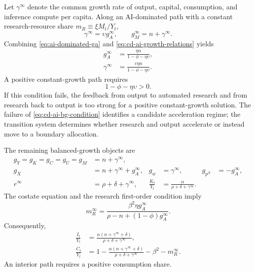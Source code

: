 Let $\gamma^\infty$ denote the common growth rate of output, capital,
consumption, and inference compute per capita. Along an AI-dominated path with a
constant research-resource share $m_R\equiv\xi M_t/Y_t$,
\begin{equation}
    \gamma^\infty=\upsilon g_A^\infty,
    \qquad
    g_M^\infty=n+\gamma^\infty.
    \label{eq:cd-ai-growth-relations}
\end{equation}
Combining \eqref{eq:ai-dominated-ga} and
\eqref{eq:cd-ai-growth-relations} yields
\begin{align}
    g_A^\infty
    &=
    \frac{\eta n}
    {1-\phi-\eta\upsilon},
    \label{eq:cd-ai-ga}\\
    \gamma^\infty
    &=
    \frac{\upsilon\eta n}
    {1-\phi-\eta\upsilon}.
    \label{eq:cd-ai-gamma}
\end{align}
A positive constant-growth path requires
\begin{equation}
    1-\phi-\eta\upsilon>0.
    \label{eq:cd-ai-bg-condition}
\end{equation}
If this condition fails, the feedback from output to automated research and from
research back to output is too strong for a positive constant-growth solution. The
failure of \eqref{eq:cd-ai-bg-condition} identifies a candidate acceleration regime;
the transition system determines whether research and output accelerate or instead
move to a boundary allocation.

The remaining balanced-growth objects are
\begin{align}
    g_Y=g_K=g_C=g_U=g_M&=n+\gamma^\infty,
    \label{eq:aggregate-bg-rates}\\
    g_X&=n+\gamma^\infty+g_A^\infty,
    &
    g_w&=\gamma^\infty,
    &
    g_{p^X}&=-g_A^\infty,
    \label{eq:other-bg-rates}\\
    r^\infty&=\rho+\delta+\gamma^\infty,
    &
    \frac{K_t}{Y_t}
    &=
    \frac{\alpha}{\rho+\delta+\gamma^\infty}.
    \label{eq:bg-capital-output}
\end{align}
The costate equation and the research first-order condition imply
\begin{equation}
    m_R^\infty
    =
    \frac{\beta^2\eta g_A^\infty}
    {\rho-n+(1-\phi)g_A^\infty}.
    \label{eq:bg-research-resource-share}
\end{equation}
Consequently,
\begin{align}
    \frac{I_t}{Y_t}
    &=
    \frac{\alpha(n+\gamma^\infty+\delta)}
    {\rho+\delta+\gamma^\infty},
    \label{eq:bg-investment-share}\\
    \frac{C_t}{Y_t}
    &=
    1-
    \frac{\alpha(n+\gamma^\infty+\delta)}
    {\rho+\delta+\gamma^\infty}
    -\beta^2-m_R^\infty.
    \label{eq:bg-consumption-share}
\end{align}
An interior path requires a positive consumption share.

